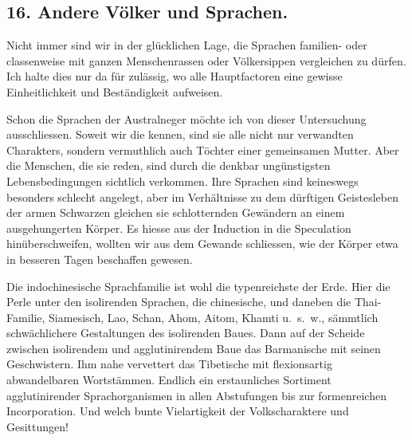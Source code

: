 \subsection*{16. Andere Völker und Sprachen.}\label{IV.IV.16}

Nicht immer sind wir in der glücklichen Lage, die Sprachen familien- oder classenweise mit ganzen Menschenrassen oder Völkersippen vergleichen zu dürfen. Ich halte dies nur da für zulässig, wo alle Hauptfactoren eine gewisse Einheitlichkeit und Beständigkeit aufweisen.

\label{fp.404}

Schon die Sprachen der Australneger möchte ich von dieser Untersuchung ausschliessen. Soweit wir die kennen, sind sie alle nicht nur verwandten Charakters, sondern vermuthlich auch Töchter einer gemeinsamen Mutter. Aber die Menschen, die sie reden, sind durch die denkbar ungünstigsten Lebensbedingungen sichtlich verkommen. Ihre Sprachen sind keineswegs besonders schlecht angelegt, aber im Verhältnisse zu dem dürftigen Geistesleben der armen Schwarzen gleichen sie schlotternden Gewändern an einem ausgehungerten Körper. Es hiesse aus der Induction in die Speculation hinüberschweifen, \label{sp.426} wollten wir aus dem Gewande schliessen, wie der Körper etwa in besseren Tagen beschaffen gewesen.

Die indochinesische Sprachfamilie ist wohl die typenreichste der Erde. Hier die Perle unter den isolirenden Sprachen, die chinesische, und daneben die Thai-Familie, Siamesisch, Lao, Schan, Ahom, Aitom, Khamti u.~s.~w., sämmtlich schwächlichere Gestaltungen des isolirenden Baues. Dann auf der Scheide zwischen isolirendem und agglutinirendem Baue das Barmanische mit seinen Geschwistern. Ihm nahe vervettert das Tibetische mit flexionsartig abwandelbaren Wortstämmen. Endlich ein erstaunliches Sortiment agglutinirender Sprachorganismen in allen Abstufungen bis zur formenreichen Incorporation. Und welch bunte Vielartigkeit der Volkscharaktere und Gesittungen!

